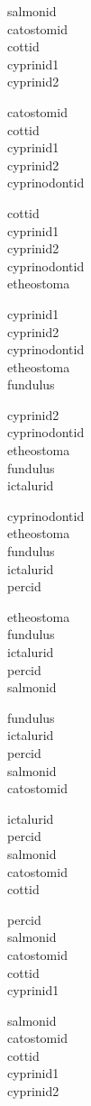 \documentclass[11pt]{article}
\begin{document}
\begin{multicols*}{3}
salmonid\\
catostomid \\
cottid \\
cyprinid1 \\
cyprinid2 \bigskip

catostomid \\
cottid \\
cyprinid1 \\
cyprinid2 \\
cyprinodontid \bigskip

cottid \\
cyprinid1 \\
cyprinid2 \\
cyprinodontid \\
etheostoma \bigskip

cyprinid1 \\
cyprinid2 \\
cyprinodontid \\
etheostoma \\
fundulus \bigskip

cyprinid2 \\
cyprinodontid \\
etheostoma \\
fundulus \\
ictalurid

\columnbreak

cyprinodontid \\
etheostoma \\
fundulus \\
ictalurid \\
percid  \bigskip

etheostoma \\
fundulus \\
ictalurid \\
percid \\
salmonid \bigskip

fundulus \\
ictalurid \\
percid \\
salmonid \\
catostomid \bigskip

ictalurid \\
percid \\
salmonid\\
catostomid \\
cottid \bigskip

percid \\
salmonid\\
catostomid \\
cottid \\
cyprinid1 \bigskip

salmonid\\
catostomid \\
cottid \\
cyprinid1 \\
cyprinid2
\end{multicols*}
\end{document}
